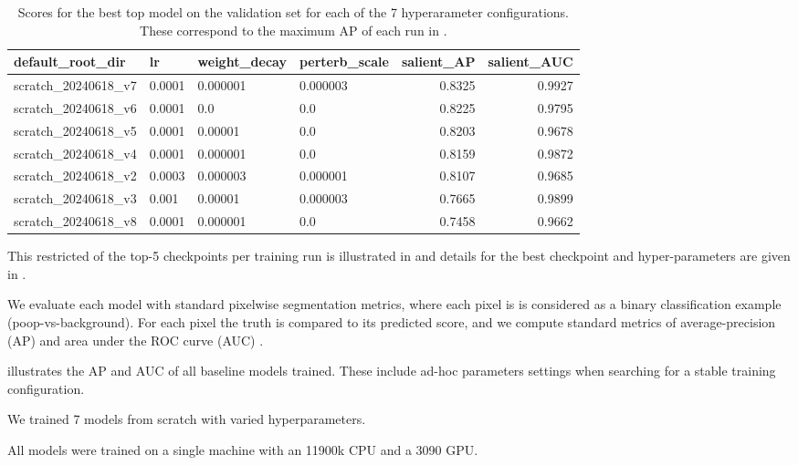 \documentclass[10pt,twocolumn,letterpaper]{article}
\begin{document}
\begin{table*}[t]
\centering
\begin{tabular}{llllrr}
\toprule
                       default\_root\_dir &      lr & weight\_decay & perterb\_scale &  salient\_AP &  salient\_AUC \\
\midrule
scratch\_20240618\_v7 &  0.0001 &     0.000001 &      0.000003 &    0.8325&     0.9927\\
scratch\_20240618\_v6 &  0.0001 &          0.0 &           0.0 &    0.8225&     0.9795\\
scratch\_20240618\_v5 &  0.0001 &      0.00001 &           0.0 &    0.8203&     0.9678\\
scratch\_20240618\_v4 &  0.0001 &     0.000001 &           0.0 &    0.8159&     0.9872\\
scratch\_20240618\_v2 &  0.0003 &     0.000003 &      0.000001 &    0.8107&     0.9685\\
scratch\_20240618\_v3 &   0.001 &      0.00001 &      0.000003 &    0.7665&     0.9899\\
scratch\_20240618\_v8 &  0.0001 &     0.000001 &           0.0 &    0.7458&     0.9662\\
\bottomrule
\end{tabular}
\caption{
    Scores for the best top model on the validation set for each of the 7 hyperarameter configurations. These correspond to the maximum AP 
    of each run in .
}
\label{tab:parameters_and_results}
\end{table*}


This restricted of the top-5 checkpoints per training run is illustrated in  and details for the best checkpoint and hyper-parameters are given in .

We evaluate each model with standard pixelwise segmentation metrics, where each
pixel is is considered as a binary classification example (poop-vs-background).
For each pixel the truth is compared to its predicted score, and we compute
standard metrics of average-precision (AP) and  area under the ROC curve (AUC)
\cite{powers_evaluation_2011}.

 illustrates the AP and AUC of all baseline models trained.
These include ad-hoc parameters settings when searching for a stable training
configuration.


We trained 7 models from scratch with varied hyperparameters.

All models were trained on a single machine with an 11900k CPU and a 3090 GPU.
\end{document}
